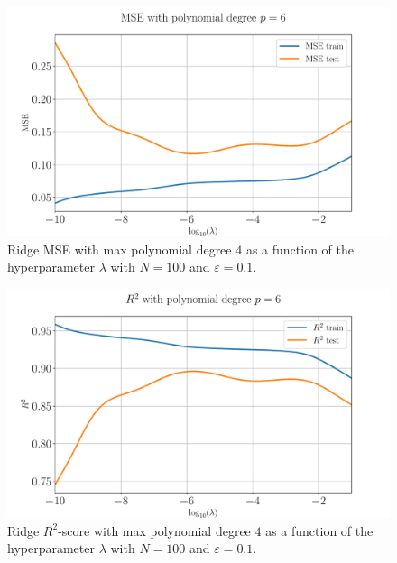 \documentclass[%
reprint,
amsmath,amssymb,
aps,
pra,
]{revtex4-2}
\begin{document}
\begin{figure}[ht!]
	\centering
	\includegraphics[width=\linewidth]{Python/Figures/Ridge/RIDGE_logMSE_no_scaling.pdf}
	\caption{Ridge MSE with max polynomial degree $4$ as a function of the hyperparameter $\lambda$ with $N=100$ and $\varepsilon=0.1$.}
	\label{fig:ridge_logMSE_degree}
\end{figure}
\begin{figure}[ht!]
	\centering
	\includegraphics[width=\linewidth]{Python/Figures/Ridge/RIDGE_logR2_no_scaling.pdf}
	\caption{Ridge $R^2$-score with max polynomial degree $4$ as a function of the hyperparameter $\lambda$ with $N=100$ and $\varepsilon=0.1$.}
	\label{fig:ridge_logR2_degree}
\end{figure}
\end{document}
